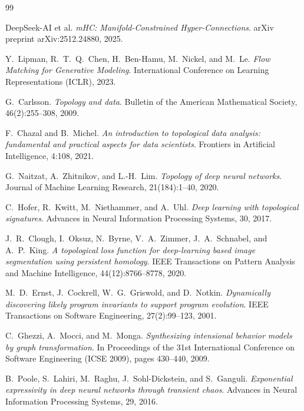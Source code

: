 \documentclass[10pt,leqno]{amsart}
\begin{document}
\begin{thebibliography}{99}

DeepSeek-AI et al.
\textit{mHC: Manifold-Constrained Hyper-Connections}.
arXiv preprint arXiv:2512.24880, 2025.

Y.~Lipman, R.~T.~Q.~Chen, H.~Ben-Hamu, M.~Nickel, and M.~Le.
\textit{Flow Matching for Generative Modeling}.
International Conference on Learning Representations (ICLR), 2023.

G.~Carlsson.
\textit{Topology and data}.
Bulletin of the American Mathematical Society, 46(2):255--308, 2009.

F.~Chazal and B.~Michel.
\textit{An introduction to topological data analysis: fundamental and practical aspects for data scientists}.
Frontiers in Artificial Intelligence, 4:108, 2021.

G.~Naitzat, A.~Zhitnikov, and L.-H.~Lim.
\textit{Topology of deep neural networks}.
Journal of Machine Learning Research, 21(184):1--40, 2020.

C.~Hofer, R.~Kwitt, M.~Niethammer, and A.~Uhl.
\textit{Deep learning with topological signatures}.
Advances in Neural Information Processing Systems, 30, 2017.

J.~R.~Clough, I.~Oksuz, N.~Byrne, V.~A.~Zimmer, J.~A.~Schnabel, and A.~P.~King.
\textit{A topological loss function for deep-learning based image segmentation using persistent homology}.
IEEE Transactions on Pattern Analysis and Machine Intelligence, 44(12):8766--8778, 2020.

M.~D.~Ernst, J.~Cockrell, W.~G.~Griswold, and D.~Notkin.
\textit{Dynamically discovering likely program invariants to support program evolution}.
IEEE Transactions on Software Engineering, 27(2):99--123, 2001.

C.~Ghezzi, A.~Mocci, and M.~Monga.
\textit{Synthesizing intensional behavior models by graph transformation}.
In Proceedings of the 31st International Conference on Software Engineering (ICSE 2009), pages 430--440, 2009.

B.~Poole, S.~Lahiri, M.~Raghu, J.~Sohl-Dickstein, and S.~Ganguli.
\textit{Exponential expressivity in deep neural networks through transient chaos}.
Advances in Neural Information Processing Systems, 29, 2016.


\end{thebibliography}
\end{document}
